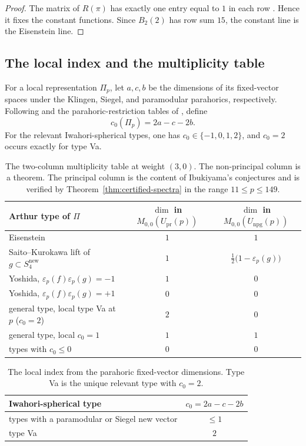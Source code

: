 \documentclass[10pt,a4paper]{amsart}
\newcommand{\Upr}{U_{\mathrm{pr}}}
\newcommand{\snew}{S^{\mathrm{new}}}
\newcommand{\eps}{\varepsilon}
\providecommand{\Upr}{U_{\mathrm{pr}}}
\providecommand{\snew}{S^{\mathrm{new}}}
\begin{document}
	\begin{proof}
		The matrix of $R(\pi)$ has exactly one entry equal to $1$ in each row
		\cite[\S3.2]{IbukiyamaKatsura}. Hence it fixes the constant functions.
		Since $B_2(2)$ has row sum $15$, the constant line is the Eisenstein line.
	\end{proof}
	
	\subsection{The local index and the multiplicity table}
	\label{ss:local-index}
	
	For a local representation $\Pi_p$, let $a,c,b$ be the dimensions of its
	fixed-vector spaces under the Klingen, Siegel, and paramodular parahorics,
	respectively. Following \cite[Table~A.15]{RobertsSchmidt} and the
	parahoric-restriction tables of \cite{Roesner2016}, define
	\begin{equation}\label{eq:c0}
		c_0(\Pi_p)=2a-c-2b.
	\end{equation}
	For the relevant Iwahori-spherical types, one has
	$c_0\in\{-1,0,1,2\}$, and $c_0=2$ occurs exactly for type Va.
	
	\begin{table}[ht]
		\centering
		\begin{tabular}{l|c|c}
			Arthur type of $\Pi$ &
			$\dim$ in $M_{0,0}(\Upr(p))$ &
			$\dim$ in $M_{0,0}(U_{\mathrm{npg}}(p))$\\
			\hline
			Eisenstein & $1$ & $1$\\
			Saito--Kurokawa lift of $g\subset\snew_4$ & $1$ &
			$\tfrac12\bigl(1-\eps_p(g)\bigr)$\\
			Yoshida, $\eps_p(f)\eps_p(g)=-1$ & $1$ & $0$\\
			Yoshida, $\eps_p(f)\eps_p(g)=+1$ & $0$ & $0$\\
			general type, local type Va at $p$ \textup{(}$c_0=2$\textup{)} & $2$ & $0$\\
			general type, local $c_0=1$ & $1$ & $1$\\
			types with $c_0\le0$ & $0$ & $0$
		\end{tabular}
		\caption{The two-column multiplicity table at weight $(3,0)$. The
			non-principal column is a theorem. The principal column is the content of
			Ibukiyama's conjectures and is verified by Theorem~\ref{thm:certified-spectra}
			in the range $11\le p\le149$.}
		\label{tab:twocol}
	\end{table}
	
	\begin{table}[ht]
		\centering
		\begin{tabular}{l|c}
			Iwahori-spherical type & $c_0=2a-c-2b$\\
			\hline
			types with a paramodular or Siegel new vector & $\le1$\\
			type Va & $2$
		\end{tabular}
		\caption{The local index from the parahoric fixed-vector dimensions.
			Type Va is the unique relevant type with $c_0=2$.}
		\label{tab:c0}
	\end{table}
	
\end{document}
